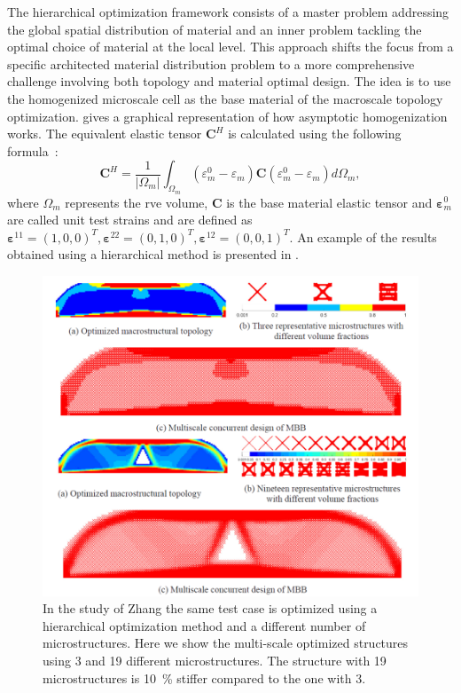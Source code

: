 The hierarchical optimization framework consists of a master problem addressing the global spatial distribution of material and an inner problem tackling the optimal choice of material at the local level. This approach shifts the focus from a specific architected material distribution problem to a more comprehensive challenge involving both topology and material optimal design. The idea is to use the homogenized microscale cell as the base material of the macroscale topology optimization.  gives a graphical representation of how asymptotic homogenization works. The equivalent elastic tensor $\mathbf{C}^{H}$ is calculated using the following formula~:
\begin{equation}
    \mathbf{C}^{H}=\frac{1}{\left|\Omega_{m}\right|} \int_{\Omega_{m}} \left(\varepsilon_{m}^{0}-\varepsilon_{m}\right)\mathbf{C}\left(\varepsilon_{m}^{0}-\varepsilon_{m}\right) d \Omega_{m},
\end{equation}
where $\Omega_{m}$ represents the \gls{rve} volume, $\mathbf{C}$ is the base material elastic tensor and $\boldsymbol{\varepsilon}_{m}^{0}$ are called unit test strains and are defined as $\boldsymbol{\varepsilon}^{11}=(1,0,0)^{T}, \boldsymbol{\varepsilon}^{22}=(0,1,0)^{T}, \boldsymbol{\varepsilon}^{12}=(0,0,1)^{T}$. An example of the results obtained using a hierarchical method is presented in .
\begin{figure}
    \centering
    \includegraphics[width=0.9\linewidth]{figures/02_literature/top_multiscale.png}
    \caption{In the study of Zhang \etal \cite{zhang_multiscale_2018} the same test case is optimized using a hierarchical optimization method and a different number of microstructures. Here we show the multi-scale optimized structures using 3 and 19 different microstructures. The structure with 19 microstructures is \qty{10}{\percent} stiffer compared to the one with 3.}
    \label{fig:02_hierarchical}
\end{figure}

